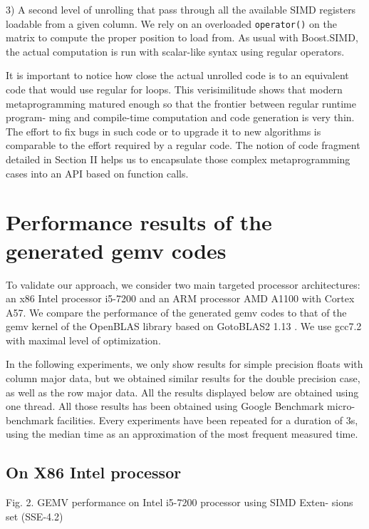 \documentclass[../main]{subfiles}
\begin{document}
3) A second level of unrolling that pass through all the
available SIMD registers loadable from a given column.
We rely on an overloaded \lstinline{operator()} on the matrix
to compute the proper position to load from. As usual
with Boost.SIMD, the actual computation is run with
scalar-like syntax using regular operators.

It is important to notice how close the actual unrolled code
is to an equivalent code that would use regular for loops. This
verisimilitude shows that modern metaprogramming matured
enough so that the frontier between regular runtime program-
ming and compile-time computation and code generation is
very thin. The effort to fix bugs in such code or to upgrade
it to new algorithms is comparable to the effort required
by a regular code. The notion of code fragment detailed
in Section II helps us to encapsulate those complex metaprogramming
cases into an API based on function calls.

\section{
  Performance results of the generated gemv codes
}

To validate our approach, we consider two main targeted
processor architectures: an x86 Intel processor i5-7200 and an
ARM processor AMD A1100 with Cortex A57. We compare
the performance of the generated gemv codes to that of the
gemv kernel of the OpenBLAS library based on GotoBLAS2
1.13 \cite{hpcs21}. We use gcc7.2 \cite{hpcs22} with maximal
level of optimization.

In the following experiments, we only show results
for simple precision floats with column major data, but we
obtained similar results for the double precision case, as well
as the row major data. All the results displayed below are
obtained using one thread. All those results has been obtained
using Google Benchmark micro-benchmark facilities. Every
experiments have been repeated for a duration of 3s, using
the median time as an approximation of the most frequent
measured time.

\subsection{
  On X86 Intel processor
}


Fig. 2. GEMV performance on Intel i5-7200 processor using SIMD Exten-
sions set (SSE-4.2)
\end{document}
